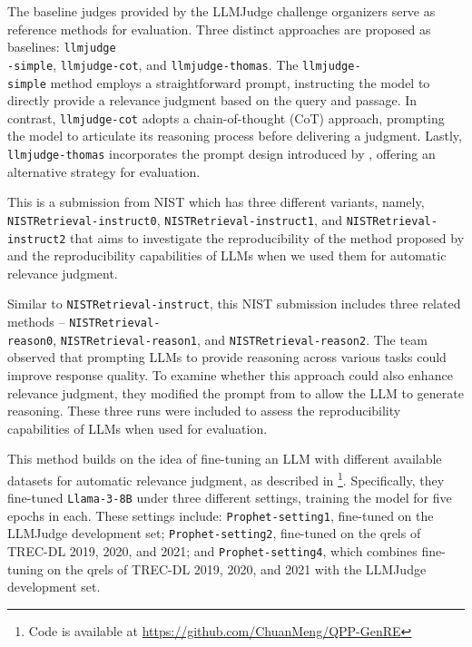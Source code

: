 The baseline judges provided by the LLMJudge challenge organizers serve as reference methods for evaluation. Three distinct approaches are proposed as baselines: \texttt{llmjudge\\-simple}, \texttt{llmjudge-cot}, and \texttt{llmjudge-thomas}. The \texttt{llmjudge-\\simple} method employs a straightforward prompt, instructing the model to directly provide a relevance judgment based on the query and passage. In contrast, \texttt{llmjudge-cot} adopts a chain-of-thought (CoT) approach, prompting the model to articulate its reasoning process before delivering a judgment. Lastly, \texttt{llmjudge-thomas} incorporates the prompt design introduced by \cite{thomas2023large}, offering an alternative strategy for evaluation.

This is a submission from NIST which has three different variants, namely, \texttt{NISTRetrieval-instruct0}, \texttt{NISTRetrieval-instruct1}, and \texttt{NISTRetrieval-instruct2} that aims to investigate the reproducibility of the method proposed by \citet{thomas2023large} and the reproducibility capabilities of LLMs when we used them for automatic relevance judgment.

Similar to \texttt{NISTRetrieval-instruct}, this NIST submission includes three related methods -- \texttt{NISTRetrieval-\\reason0}, \texttt{NISTRetrieval-reason1}, and \texttt{NISTRetrieval-reason2}. The team observed that prompting LLMs to provide reasoning across various tasks could improve response quality. To examine whether this approach could also enhance relevance judgment, they modified the prompt from \citet{thomas2023large} to allow the LLM to generate reasoning. These three runs were included to assess the reproducibility capabilities of LLMs when used for evaluation.

This method builds on the idea of fine-tuning an LLM with different available datasets for automatic relevance judgment, as described in \cite{meng2024query}\footnote{Code is available at \url{https://github.com/ChuanMeng/QPP-GenRE}}. Specifically, they fine-tuned \texttt{Llama-3-8B} under three different settings, training the model for five epochs in each. These settings include: \texttt{Prophet-setting1}, fine-tuned on the LLMJudge development set; \texttt{Prophet-setting2}, fine-tuned on the qrels of TREC-DL 2019, 2020, and 2021; and \texttt{Prophet-setting4}, which combines fine-tuning on the qrels of TREC-DL 2019, 2020, and 2021 with the LLMJudge development set.

